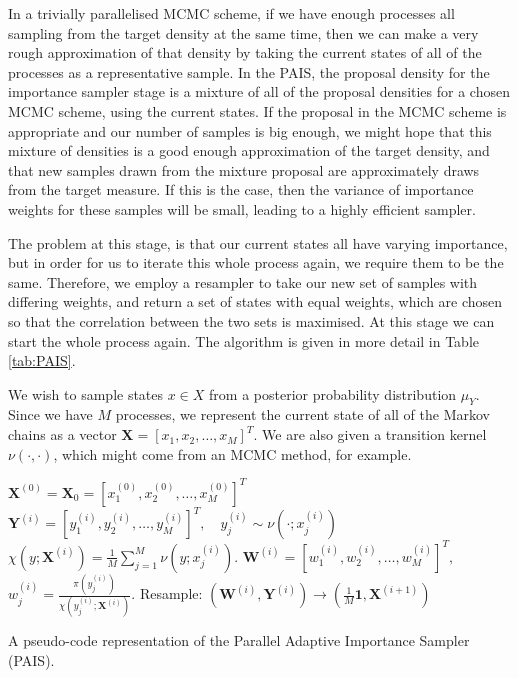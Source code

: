 \documentclass[final]{siamltex}
\newcommand{\X}{{\mathbf X}}
\newcommand{\Y}{{\mathbf Y}}
\newcommand{\W}{{\mathbf W}}
\begin{document}
In a trivially parallelised MCMC scheme, if we have enough processes
all sampling from the target density at the same time, then we can
make a very rough approximation of that density by taking the current
states of all of the processes as a representative sample. In the
PAIS, the proposal density for the importance sampler stage is a
mixture of all of the proposal densities for a chosen MCMC scheme,
using the current states. If the proposal in the MCMC scheme is
appropriate and our number of samples is big enough, we might hope
that this mixture of densities is a good enough approximation of the
target density, and that new samples drawn from
the mixture proposal are approximately draws from the target
measure. If this is the case, then the variance of importance weights
for these samples will be small, leading to a highly efficient
sampler.

The problem at this stage, is that our current states all have varying
importance, but in order for us to iterate this whole process again,
we require them to be the same. Therefore, we employ a resampler to
take our new set of samples with differing weights, and return a set
of states with equal weights, which are chosen so that the correlation
between the two sets is maximised. At this stage we can start the whole
process again. The algorithm is given in more detail in Table \ref{tab:PAIS}. 

We wish to sample states $x \in X$ from a posterior
probability distribution $\mu_Y$. Since we have $M$ processes, we
represent the current state of all of the Markov chains as a vector
$\X = [x_1,x_2,\ldots,x_M]^T$. We are also given a transition kernel
$\nu(\cdot,\cdot)$, which might come from an MCMC method, for example.

\begin{table}
\begin{mdframed}
\begin{algorithmic}
\STATE $\X^{(0)} = \X_0 = [x_1^{(0)},x_2^{(0)},\ldots,x_M^{(0)}]^T$
\STATE $\Y^{(i)} = [y_1^{(i)},y_2^{(i)},\ldots,y_M^{(i)}]^T, \quad y_j^{(i)} \sim
\nu(\cdot;x_j^{(i)})$
\STATE $\chi(y;\X^{(i)}) = \frac{1}{M}
\sum_{j=1}^M \nu(y;x_j^{(i)})$.
\STATE $\W^{(i)} = [w_1^{(i)},w_2^{(i)},\ldots,w_M^{(i)}]^T,$ \quad $w^{(i)}_j =
\frac{\pi(y_j^{(i)})}{\chi(y_j^{(i)};\X^{(i)})}$.
\STATE Resample: $(\W^{(i)},\Y^{(i)}) \rightarrow (\frac{1}{M}\mathbf{1}, \X^{(i+1)})$
\ENDFOR 
\end{algorithmic}
\end{mdframed}

\caption{A pseudo-code representation of the Parallel Adaptive
  Importance Sampler (PAIS).}
\label{tab:PAIS}
\end{table}
\end{document}
